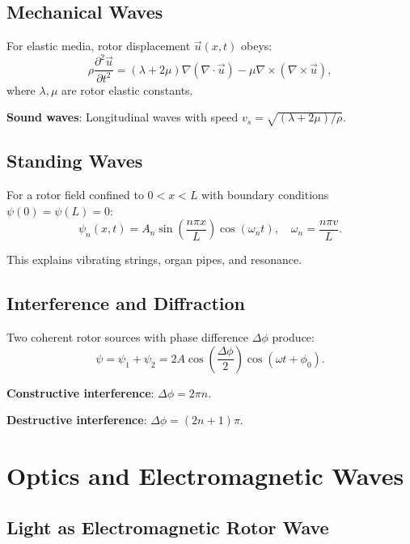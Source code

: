 \documentclass[12pt,a4paper]{article}
\theoremstyle{definition}
\theoremstyle{remark}
\begin{document}
\subsection{Mechanical Waves}

For elastic media, rotor displacement $\vec{u}(x,t)$ obeys:
\begin{equation}
\rho \frac{\partial^2 \vec{u}}{\partial t^2} = (\lambda + 2\mu) \nabla(\nabla \cdot \vec{u}) - \mu \nabla \times (\nabla \times \vec{u}),
\end{equation}
where $\lambda, \mu$ are rotor elastic constants.

\textbf{Sound waves}: Longitudinal waves with speed $v_s = \sqrt{(\lambda + 2\mu)/\rho}$.

\subsection{Standing Waves}

For a rotor field confined to $0 < x < L$ with boundary conditions $\psi(0) = \psi(L) = 0$:
\begin{equation}
\psi_n(x,t) = A_n \sin\left(\frac{n\pi x}{L}\right) \cos(\omega_n t), \quad \omega_n = \frac{n\pi v}{L}.
\end{equation}

This explains vibrating strings, organ pipes, and resonance.

\subsection{Interference and Diffraction}

Two coherent rotor sources with phase difference $\Delta \phi$ produce:
\begin{equation}
\psi = \psi_1 + \psi_2 = 2A\cos\left(\frac{\Delta \phi}{2}\right) \cos(\omega t + \phi_0).
\end{equation}

\textbf{Constructive interference}: $\Delta \phi = 2\pi n$.

\textbf{Destructive interference}: $\Delta \phi = (2n+1)\pi$.

\section{Optics and Electromagnetic Waves}

\subsection{Light as Electromagnetic Rotor Wave}
\end{document}
